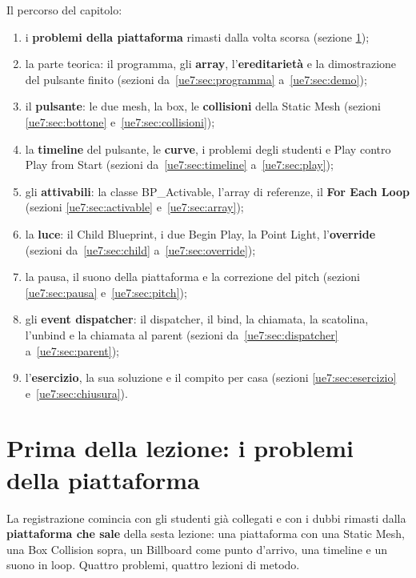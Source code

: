 Il percorso del capitolo:
\begin{enumerate}
  \item i \textbf{problemi della piattaforma} rimasti dalla volta scorsa (sezione
        \ref{ue7:sec:problemi});
  \item la parte teorica: il programma, gli \textbf{array}, l'\textbf{ereditarietà} e la
        dimostrazione del pulsante finito (sezioni da~\ref{ue7:sec:programma}
        a~\ref{ue7:sec:demo});
  \item il \textbf{pulsante}: le due mesh, la box, le \textbf{collisioni} della Static
        Mesh (sezioni \ref{ue7:sec:bottone} e~\ref{ue7:sec:collisioni});
  \item la \textbf{timeline} del pulsante, le \textbf{curve}, i problemi degli studenti e
        Play contro Play from Start (sezioni da~\ref{ue7:sec:timeline}
        a~\ref{ue7:sec:play});
  \item gli \textbf{attivabili}: la classe BP\_Activable, l'array di referenze, il
        \textbf{For Each Loop} (sezioni \ref{ue7:sec:activable}
        e~\ref{ue7:sec:array});
  \item la \textbf{luce}: il Child Blueprint, i due Begin Play, la Point Light,
        l'\textbf{override} (sezioni da~\ref{ue7:sec:child} a~\ref{ue7:sec:override});
  \item la pausa, il suono della piattaforma e la correzione del pitch (sezioni
        \ref{ue7:sec:pausa} e~\ref{ue7:sec:pitch});
  \item gli \textbf{event dispatcher}: il dispatcher, il bind, la chiamata, la scatolina,
        l'unbind e la chiamata al parent (sezioni da~\ref{ue7:sec:dispatcher}
        a~\ref{ue7:sec:parent});
  \item l'\textbf{esercizio}, la sua soluzione e il compito per casa (sezioni
        \ref{ue7:sec:esercizio} e~\ref{ue7:sec:chiusura}).
\end{enumerate}

\section{Prima della lezione: i problemi della piattaforma}
\label{ue7:sec:problemi}

La registrazione comincia con gli studenti già collegati e con i dubbi rimasti dalla
\textbf{piattaforma che sale} della sesta lezione: una piattaforma con una Static Mesh,
una Box Collision sopra, un Billboard come punto d'arrivo, una timeline e un suono in
loop. Quattro problemi, quattro lezioni di metodo.

